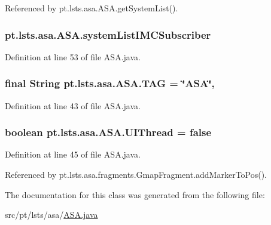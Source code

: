Referenced by pt.\+lsts.\+asa.\+A\+S\+A.\+get\+System\+List().

\hypertarget{classpt_1_1lsts_1_1asa_1_1ASA_a62b74f0d8e70e3c48956556b4a059c7a}{}
\subsubsection[{system\+List\+I\+M\+C\+Subscriber}]{ pt.\+lsts.\+asa.\+A\+S\+A.\+system\+List\+I\+M\+C\+Subscriber}\label{classpt_1_1lsts_1_1asa_1_1ASA_a62b74f0d8e70e3c48956556b4a059c7a}


Definition at line 53 of file A\+S\+A.\+java.

\hypertarget{classpt_1_1lsts_1_1asa_1_1ASA_acbc3f54345385bf9a149020e88ff8f9d}{}
\subsubsection[{T\+A\+G}]{\setlength{\rightskip}{0pt plus 5cm}final String pt.\+lsts.\+asa.\+A\+S\+A.\+T\+A\+G = \char`\"{}A\+S\+A\char`\"{}\hspace{0.3cm}{\ttfamily [static]}, {\ttfamily [private]}}\label{classpt_1_1lsts_1_1asa_1_1ASA_acbc3f54345385bf9a149020e88ff8f9d}


Definition at line 43 of file A\+S\+A.\+java.

\hypertarget{classpt_1_1lsts_1_1asa_1_1ASA_af45cdf877804002113beca9a8c497e4e}{}
\subsubsection[{U\+I\+Thread}]{\setlength{\rightskip}{0pt plus 5cm}boolean pt.\+lsts.\+asa.\+A\+S\+A.\+U\+I\+Thread = false}\label{classpt_1_1lsts_1_1asa_1_1ASA_af45cdf877804002113beca9a8c497e4e}


Definition at line 45 of file A\+S\+A.\+java.



Referenced by pt.\+lsts.\+asa.\+fragments.\+Gmap\+Fragment.\+add\+Marker\+To\+Pos().



The documentation for this class was generated from the following file\+:\begin{DoxyCompactItemize}
\item 
src/pt/lsts/asa/\hyperlink{ASA_8java}{A\+S\+A.\+java}\end{DoxyCompactItemize}
